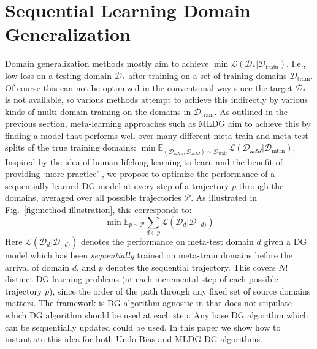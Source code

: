 \documentclass[runningheads]{llncs}
\begin{document}
\section{Sequential Learning Domain Generalization}
Domain generalization methods mostly aim to achieve $\min\mathcal{L}(\mathcal{D}_*|\mathcal{D}_{\text{train}})$. I.e., low loss on a testing domain $\mathcal{D}_*$ after training on a set of training domains $\mathcal{D}_{\text{train}}$. Of course this can not be optimized in the conventional way since the target $\mathcal{D}_*$ is not available, so various methods \cite{ECCV12_Khosla,ghifary2015domain,muandet2013domaingeneralization} attempt to achieve this indirectly by various kinds of multi-domain training on the domains in $\mathcal{D}_{\text{train}}$. As outlined in the previous section, meta-learning approaches such as MLDG aim to achieve this by finding a model that performs well over many different meta-train and meta-test splits of the true training domains: $\min \mathbb{E}_{(\mathcal{D}_\mathcal{\text{mtrn}},\mathcal{D}_\mathcal{\text{mtst}})\sim \mathcal{D}_{\text{train}}}\mathcal{L}(\mathcal{D}_\mathcal{\text{mtst}}|\mathcal{D}_{\text{mtrn}})$. Inspired by the idea of human lifelong learning-to-learn \cite{smith2002humanL2L} and the benefit of providing `more practice' \cite{doersch2017mtlSelfSup,jaderberg2017unsupAuxRL}, we propose to optimize the performance of a sequentially learned DG model at every step of a trajectory $p$ through the domains, averaged over all possible trajectories $\mathcal{P}$. As illustrated in Fig.~\ref{fig:method-illustration}, this corresponds to:
\small
\begin{equation}
\operatorname{min} \mathbb{E}_{p\sim\mathcal{P}}\sum_{d\in p}\mathcal{L}(\mathcal{D}_{d}|\mathcal{D}_{[:d)})\label{eq:h}
\end{equation}
\normalsize
Here $\mathcal{L}(\mathcal{D}_{d}|\mathcal{D}_{[:d)})$ denotes the performance on meta-test domain $d$ given a DG model which has been \emph{sequentially} trained on meta-train domains before the arrival of domain $d$, and $p$ denotes the sequential trajectory. This covers $N!$ distinct DG learning problems (at each incremental step of each possible trajectory $p$), since the order of the path through any fixed set of source domains matters. The  framework is DG-algorithm agnostic in that does not stipulate which DG algorithm should be used at each step. Any base DG algorithm which can be sequentially updated could be used. In this paper we show how to instantiate this idea for both Undo Bias \cite{ECCV12_Khosla} and MLDG \cite{Li2018MLDG} DG algorithms.
\end{document}
